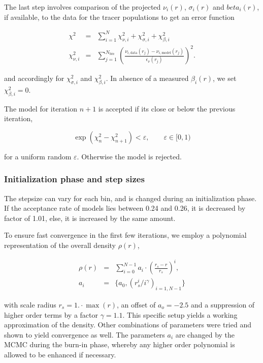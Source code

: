The last step involves comparison of the projected $\nu_i(r)$,
$\sigma_i(r)$ and $beta_i(r)$, if available, to the data for the
tracer populations to get an error function

\begin{eqnarray}
\chi^2 &=& \sum_{i=1}^N \chi_{\nu,i}^2 + \chi_{\sigma,i}^2 + \chi_{\beta,i}^2\\
\chi_{\nu,i}^2 &=& \sum_{j=1}^{N_{bin}} \left(\frac{\nu_{i,\text{data}}(r_j)-\nu_{i,\text{model}}(r_j)}{\epsilon_\nu(r_j)}\right)^2.
\end{eqnarray}

and accordingly for $\chi_{\sigma,i}^2$ and $\chi_{\beta,i}^2$. In
absence of a measured $\beta_i(r)$, we set $\chi_{\beta,i}^2=0$.

The model for iteration $n+1$ is accepted if its close or below the previous iteration,

\begin{equation}
\exp(\chi^2_n - \chi^2_{n+1}) < \varepsilon,\qquad \varepsilon\in [0,1)
\end{equation}

for a uniform random $\varepsilon$. Otherwise the model is rejected.

\subsubsection{Initialization phase and step sizes}

The stepsize can vary for each bin, and is changed during an
initialization phase. If the acceptance rate of models lies between
0.24 and 0.26, it is decreased by factor of 1.01, else, it is
increased by the same amount. 

To ensure fast convergence in the first few iterations, we employ a
polynomial representation of the overall density $\rho(r)$,

\begin{eqnarray}
\rho(r)&=&\sum_{i=0}^{N-1} a_i\cdot\left(\frac{r_s-r}{r_s}\right)^i,\\
a_i&=&\{a_0,(r_s^i/i^\gamma)_{i=1,N-1}\}
\end{eqnarray}

with scale radius $r_s=1.\cdot \max(r)$, an offset of $a_o=-2.5$ and a
suppression of higher order terms by a factor $\gamma=1.1$. This
specific setup yields a working approximation of the density. Other
combinations of parameters were tried and shown to yield convergence
as well. The parameters $a_i$ are changed by the MCMC during the
burn-in phase, whereby any higher order polynomial is allowed to be
enhanced if necessary.

